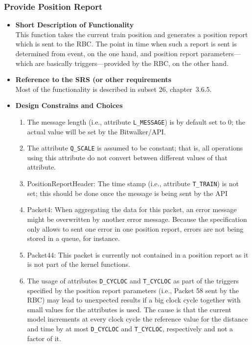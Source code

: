 \subsubsection{Provide Position Report}\label{sss:provposrep}

\begin{itemize}
\item \textbf{Short Description of Functionality}\\
This function takes the current train position and generates a position report which is sent to the RBC. The point in time when such a report is sent is determined from event, on the one hand, and position report parameters---which are basically triggers---provided by the RBC, on the other hand. 
\item \textbf{Reference to the SRS (or other requirements}\\
Most of the functionality is described in subset 26, chapter~3.6.5.
\item \textbf{Design Constrains and Choices}\\
\begin{enumerate}
	\item The message length (i.e., attribute \verb+L_MESSAGE+) is by default set to 0; the actual value will be set by the Bitwalker/API.
	\item The attribute \verb+Q_SCALE+ is assumed to be constant; that is, all operations using this attribute do not convert between different values of that attribute.
	\item PositionReportHeader: The time stamp (i.e., attribute \verb+T_TRAIN+) is not set; this should be done once the message is being sent by the API
	\item Packet4: When aggregating the data for this packet, an error message might be overwritten by another error message. Because the specification only allows to sent one error in one position report, errors are not being stored in a queue, for instance.
	\item Packet44: This packet is currently not contained in a position report as it is not part of the kernel functions.
	\item The usage of attributes \verb+D_CYCLOC+ and \verb+T_CYCLOC+ as part of the triggers specified by the position report parameters (i.e., Packet 58 sent by the RBC) may lead to unexpected results if a big clock cycle together with small values for the attributes is used. The cause is that the current model increments at every clock cycle the reference value for the distance and time by at most \verb+D_CYCLOC+ and \verb+T_CYCLOC+, respectively and not a factor of it.
\end{enumerate}
\end{itemize}
